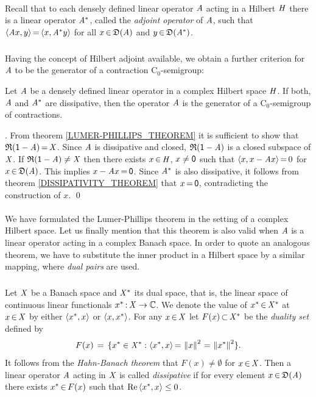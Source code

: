 \documentclass[11pt,twoside]{article}
\begin{document}
\paragraph{} 
Recall that to each densely defined linear operator $\mathit{A}$
acting in a Hilbert $\mathit{H}$
there is a linear operator $\mathit{A}^*$,
called the \textit{adjoint operator} of $\mathit{A}$,
such that
$
\langle \mathit{A} x,y \rangle {\,=\,} \langle x,\mathit{A}^* y \rangle
$
for all $x {\,\in\,} \mathfrak{D}(\mathit{A})$ and $y {\,\in\,} \mathfrak{D}(\mathit{A}^*)$.

\subparagraph{}
Having the concept of Hilbert adjoint available,
we obtain a further criterion for $\mathit{A}$ to be
the generator of a contraction C$_0$-semigroup: 

\begin{theorem}\label{ADJ_DISS}
Let $\mathit{A}$ be a densely defined linear operator
in a complex Hilbert space $\mathit{H}$.
If both,
$\mathit{A}$ and $\mathit{A}^*$ are dissipative,
then the operator $\mathit{A}$ is the generator
of a C$_0$-semigroup of contractions.
\end{theorem}

\Proof.
From theorem \ref{LUMER-PHILLIPS_THEOREM} it is sufficient to show
that $\mathfrak{R}({\mathsf{1}}-\mathit{A}) {\,=\,} \mathit{X}$.
Since $\mathit{A}$ is dissipative and closed,
$\mathfrak{R}({\mathsf{1}}-\mathit{A})$ is a closed subspace of $\mathit{X}$.
If $\mathfrak{R}({\mathsf{1}}-\mathit{A}) \neq \mathit{X}$ then there exists $x {\,\in\,} \mathit{H}$,
$x \neq {\mathsf{0}}$ such that
$\langle x,x-\mathit{A} x \rangle {\,=\,} 0$ for $x {\,\in\,} \mathfrak{D}(\mathit{A})$.
This implies $x-\mathit{A} x {\,=\,} {\mathsf{0}}$.
Since $\mathit{A}^*$ is also dissipative,
it follows from theorem \ref{DISSIPATIVITY_THEOREM}
that $x {\,=\,} {\mathsf{0}}$,
contradicting the construction of $x$.
\qed

\paragraph*{} %
We have formulated the Lumer-Phillips theorem
in the setting of a complex Hilbert space.
Let us finally mention that this theorem is also valid when $\mathit{A}$ is a
linear operator acting in a complex Banach space.
In order to quote an analogous theorem,
we have to substitute the inner product in a Hilbert space
by a similar mapping,
where \textit{dual pairs} are used.

\subparagraph{}
Let $\mathit{X}$ be a Banach space and $\mathit{X}^*$ its dual space,
that is,
the linear space of continuous linear functionals $x^* {\,:\,} \mathit{X} \to {\mathbb{C}}$.
We denote the value of $x^* {\,\in\,} \mathit{X}^*$ at $x {\,\in\,} \mathit{X}$ by either
$\langle x^*,x \rangle$ or $\langle x,x^* \rangle$.
For any $x {\,\in\,} \mathit{X}$ let $F(x) {\,\subset\,} \mathit{X}^*$ be the \textit{duality set}
defined by
\[
F(x) \,=\, \{x^* \in \mathit{X}^*: \langle x^*,x \rangle {\,=\,} \left\lVert x \right\rVert^2 {\,=\,} \left\lVert x^* \right\rVert^2\}.
\]
It follows from the \textit{Hahn-Banach theorem}
that $F(x) \neq \emptyset$ for $x {\,\in\,} \mathit{X}$.
Then a linear operator $\mathit{A}$ acting in $\mathit{X}$ is called \textit{dissipative}
if for every element $x {\,\in\,} \mathfrak{D}(\mathit{A})$ there exists $x^* {\,\in\,} F(x)$
such that $\operatorname{Re} \, \langle x^*,x \rangle \leq 0$. 
\end{document}
